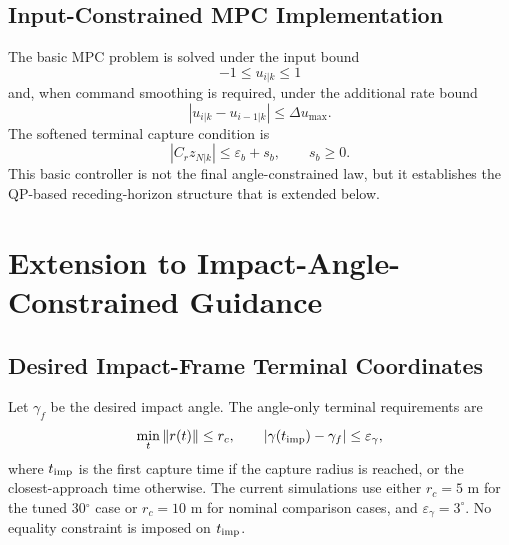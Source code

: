 \documentclass[letterpaper,journal]{IEEEtran}
\begin{document}
\subsection{Input-Constrained MPC Implementation}
The basic MPC problem is solved under the input bound
\begin{equation}
    -1\le u_{i|k}\le1
\end{equation}
and, when command smoothing is required, under the additional rate bound
\begin{equation}
    |u_{i|k}-u_{i-1|k}|\le \Delta u_{\max}.
\end{equation}
The softened terminal capture condition is
\begin{equation}
    |C_r z_{N|k}|\le \varepsilon_b+s_b,\qquad s_b\ge0 .
    \label{eq:basic_terminal_constraint}
\end{equation}
This basic controller is not the final angle-constrained law, but it establishes the QP-based receding-horizon structure that is extended below.

\section{Extension to Impact-Angle-Constrained Guidance}

\subsection{Desired Impact-Frame Terminal Coordinates}
Let $\gamma_f$ be the desired impact angle. The angle-only terminal requirements are
\begin{equation}
    \min_t \|r(t)\|\le r_c,\qquad
    |\gamma(t_{\rm imp})-\gamma_f|\le \varepsilon_\gamma ,
    \label{eq:angle_only_terminal_requirements}
\end{equation}
where $t_{\rm imp}$ is the first capture time if the capture radius is reached, or the closest-approach time otherwise. The current simulations use either $r_c=5$ m for the tuned 30$^\circ$ case or $r_c=10$ m for nominal comparison cases, and $\varepsilon_\gamma=3^\circ$. No equality constraint is imposed on $t_{\rm imp}$.
\end{document}
